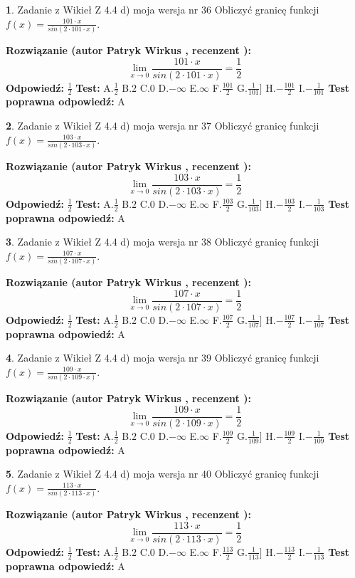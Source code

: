 \documentclass[12pt, a4paper]{article}
\theoremstyle{definition} %
\newtheorem{zad}{}
\newcommand{\zadStart}[1]{\begin{zad}#1\newline}
\newcommand{\zadStop}{\end{zad}}
\newcommand{\rozwStart}[2]{\noindent \textbf{Rozwiązanie (autor #1 , recenzent #2): }\newline}
\newcommand{\rozwStop}{\newline}
\newcommand{\odpStart}{\noindent \textbf{Odpowiedź:}\newline}
\newcommand{\odpStop}{\newline}
\newcommand{\testStart}{\noindent \textbf{Test:}\newline}
\newcommand{\testStop}{\newline}
\newcommand{\kluczStart}{\noindent \textbf{Test poprawna odpowiedź:}\newline}
\newcommand{\kluczStop}{\newline}
\begin{document}
\zadStart{Zadanie z Wikieł Z 4.4 d) moja wersja nr 36}
Obliczyć granicę funkcji $f(x)=\frac{101\cdot x}{sin(2 \cdot101\cdot x)}$.
\zadStop
\rozwStart{Patryk Wirkus}{}
$$\lim\limits_{x\to 0}\frac{101\cdot x}{sin(2 \cdot101\cdot x)}=\frac{1}{2}$$
\rozwStop
\odpStart
$\frac{1}{2}$
\odpStop
\testStart
A.$\frac{1}{2}$
B.$2$
C.$0$
D.$-\infty$
E.$\infty$
F.$\frac{101}{2}$
G.$\frac{1}{101}]$
H.$-\frac{101}{2}$
I.$-\frac{1}{101}$
\testStop
\kluczStart
A
\kluczStop



\zadStart{Zadanie z Wikieł Z 4.4 d) moja wersja nr 37}
Obliczyć granicę funkcji $f(x)=\frac{103\cdot x}{sin(2 \cdot103\cdot x)}$.
\zadStop
\rozwStart{Patryk Wirkus}{}
$$\lim\limits_{x\to 0}\frac{103\cdot x}{sin(2 \cdot103\cdot x)}=\frac{1}{2}$$
\rozwStop
\odpStart
$\frac{1}{2}$
\odpStop
\testStart
A.$\frac{1}{2}$
B.$2$
C.$0$
D.$-\infty$
E.$\infty$
F.$\frac{103}{2}$
G.$\frac{1}{103}]$
H.$-\frac{103}{2}$
I.$-\frac{1}{103}$
\testStop
\kluczStart
A
\kluczStop



\zadStart{Zadanie z Wikieł Z 4.4 d) moja wersja nr 38}
Obliczyć granicę funkcji $f(x)=\frac{107\cdot x}{sin(2 \cdot107\cdot x)}$.
\zadStop
\rozwStart{Patryk Wirkus}{}
$$\lim\limits_{x\to 0}\frac{107\cdot x}{sin(2 \cdot107\cdot x)}=\frac{1}{2}$$
\rozwStop
\odpStart
$\frac{1}{2}$
\odpStop
\testStart
A.$\frac{1}{2}$
B.$2$
C.$0$
D.$-\infty$
E.$\infty$
F.$\frac{107}{2}$
G.$\frac{1}{107}]$
H.$-\frac{107}{2}$
I.$-\frac{1}{107}$
\testStop
\kluczStart
A
\kluczStop



\zadStart{Zadanie z Wikieł Z 4.4 d) moja wersja nr 39}
Obliczyć granicę funkcji $f(x)=\frac{109\cdot x}{sin(2 \cdot109\cdot x)}$.
\zadStop
\rozwStart{Patryk Wirkus}{}
$$\lim\limits_{x\to 0}\frac{109\cdot x}{sin(2 \cdot109\cdot x)}=\frac{1}{2}$$
\rozwStop
\odpStart
$\frac{1}{2}$
\odpStop
\testStart
A.$\frac{1}{2}$
B.$2$
C.$0$
D.$-\infty$
E.$\infty$
F.$\frac{109}{2}$
G.$\frac{1}{109}]$
H.$-\frac{109}{2}$
I.$-\frac{1}{109}$
\testStop
\kluczStart
A
\kluczStop



\zadStart{Zadanie z Wikieł Z 4.4 d) moja wersja nr 40}
Obliczyć granicę funkcji $f(x)=\frac{113\cdot x}{sin(2 \cdot113\cdot x)}$.
\zadStop
\rozwStart{Patryk Wirkus}{}
$$\lim\limits_{x\to 0}\frac{113\cdot x}{sin(2 \cdot113\cdot x)}=\frac{1}{2}$$
\rozwStop
\odpStart
$\frac{1}{2}$
\odpStop
\testStart
A.$\frac{1}{2}$
B.$2$
C.$0$
D.$-\infty$
E.$\infty$
F.$\frac{113}{2}$
G.$\frac{1}{113}]$
H.$-\frac{113}{2}$
I.$-\frac{1}{113}$
\testStop
\kluczStart
A
\kluczStop
\end{document}
